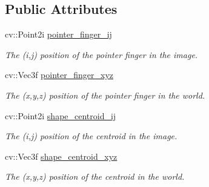 \subsection*{Public Attributes}
\begin{DoxyCompactItemize}
\item 
cv\+::\+Point2i \hyperlink{class_hand_a7a7147d586c8fc8f781be0ed0dac1d94}{pointer\+\_\+finger\+\_\+ij}
\begin{DoxyCompactList}\small\item\em The (i,j) position of the pointer finger in the image. \end{DoxyCompactList}\item 
cv\+::\+Vec3f \hyperlink{class_hand_abeb7b0f0414f128dff4a189137fe35c9}{pointer\+\_\+finger\+\_\+xyz}
\begin{DoxyCompactList}\small\item\em The (x,y,z) position of the pointer finger in the world. \end{DoxyCompactList}\item 
cv\+::\+Point2i \hyperlink{class_hand_a86d74ccce4bbfafa5825762713d38b44}{shape\+\_\+centroid\+\_\+ij}
\begin{DoxyCompactList}\small\item\em The (i,j) position of the centroid in the image. \end{DoxyCompactList}\item 
cv\+::\+Vec3f \hyperlink{class_hand_a3991a22a52268c3b469a4221fbfdb695}{shape\+\_\+centroid\+\_\+xyz}
\begin{DoxyCompactList}\small\item\em The (x,y,z) position of the centroid in the world. \end{DoxyCompactList}\end{DoxyCompactItemize}
